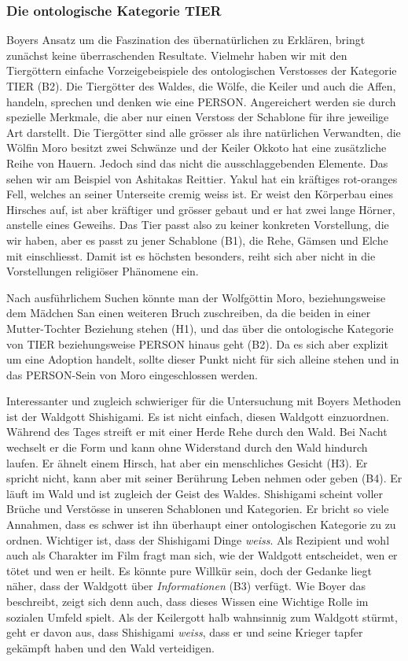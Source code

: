 \subsubsection{Die ontologische Kategorie TIER} 
Boyers Ansatz um die Faszination des übernatürlichen zu Erklären, bringt zunächst keine überraschenden Resultate. Vielmehr haben wir mit den Tiergöttern einfache Vorzeigebeispiele des ontologischen Verstosses der Kategorie TIER (B2). Die Tiergötter des Waldes, die Wölfe, die Keiler und auch die Affen, handeln, sprechen und denken wie eine PERSON. Angereichert werden sie durch spezielle Merkmale, die aber nur einen Verstoss der Schablone für ihre jeweilige Art darstellt. Die Tiergötter sind alle grösser als ihre natürlichen Verwandten, die Wölfin Moro besitzt zwei Schwänze und der Keiler Okkoto hat eine zusätzliche Reihe von Hauern. Jedoch sind das nicht die ausschlaggebenden Elemente. Das sehen wir am Beispiel von Ashitakas Reittier. Yakul hat ein kräftiges rot-oranges Fell, welches an seiner Unterseite cremig weiss ist. Er weist den Körperbau eines Hirsches auf, ist aber kräftiger und grösser gebaut und er hat zwei lange Hörner, anstelle eines Geweihs. Das Tier passt also zu keiner konkreten Vorstellung, die wir haben, aber es passt zu jener Schablone (B1), die Rehe, Gämsen und Elche mit einschliesst. Damit ist es höchsten besonders, reiht sich aber nicht in die Vorstellungen religiöser Phänomene ein. 

Nach ausführlichem Suchen könnte man der Wolfgöttin Moro, beziehungsweise dem Mädchen San einen weiteren Bruch zuschreiben, da die beiden in einer Mutter-Tochter Beziehung stehen (H1), und das über die ontologische Kategorie von TIER beziehungsweise PERSON hinaus geht (B2). Da es sich aber explizit um eine Adoption handelt, sollte dieser Punkt nicht für sich alleine stehen und in das PERSON-Sein von Moro eingeschlossen werden. 

Interessanter und zugleich schwieriger für die Untersuchung mit Boyers Methoden ist der Waldgott Shishigami. Es ist nicht einfach, diesen Waldgott einzuordnen. Während des Tages streift er mit einer Herde Rehe durch den Wald. Bei Nacht wechselt er die Form und kann ohne Widerstand durch den Wald hindurch laufen. Er ähnelt einem Hirsch, hat aber ein menschliches Gesicht (H3). Er spricht nicht, kann aber mit seiner Berührung Leben nehmen oder geben (B4). Er läuft im Wald und ist zugleich der Geist des Waldes. Shishigami scheint voller Brüche und Verstösse in unseren Schablonen und Kategorien. Er bricht so viele Annahmen, dass es schwer ist ihn überhaupt einer ontologischen Kategorie zu zu ordnen. Wichtiger ist, dass der Shishigami Dinge \emph{weiss}. Als Rezipient und wohl auch als Charakter im Film fragt man sich, wie der Waldgott entscheidet, wen er tötet und wen er heilt. Es könnte pure Willkür sein, doch der Gedanke liegt näher, dass der Waldgott über \emph{Informationen} (B3) verfügt. Wie Boyer das beschreibt, zeigt sich denn auch, dass dieses Wissen eine Wichtige Rolle im sozialen Umfeld spielt. Als der Keilergott halb wahnsinnig zum Waldgott stürmt, geht er davon aus, dass Shishigami \emph{weiss}, dass er und seine Krieger tapfer gekämpft haben und den Wald verteidigen. 

